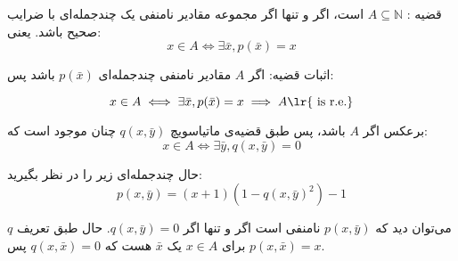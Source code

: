 قضیه :
$A\subseteq \mathbb{N}$  است، اگر و تنها اگر مجموعه مقادیر نامنفی یک چندجمله‌ای با ضرایب صحیح باشد. یعنی:
$$
x\in A \iff \exists \bar{x}, p(\bar{x}) = x
$$


اثبات قضیه: اگر $A$ مقادیر نامنفی چندجمله‌ای $p(\bar{x})$
باشد
پس:

$$
x\in A \iff \exists \bar{x}, p(\bar{x}) = x \implies A \text{\lr{ is r.e.}}
$$

برعکس اگر $A$  باشد، پس طبق قضیه‌ی ماتیاسویچ 
$q(x, \bar{y})$
چنان موجود است که:
$$
x \in A \iff \exists \bar{y}, q(x, \bar{y}) = 0
$$

حال چندجمله‌ای زیر را در نظر بگیرید:
$$
p(x,\bar{y}) = (x+1)(1-q(x, \bar{y})^2)-1
$$

می‌توان دید که $p(x,\bar{y})$
نامنفی‌ است اگر و تنها اگر $q(x,\bar{y}) = 0$.
حال طبق تعریف $q$
برای $x\in A$ یک $\bar{x}$ هست که 
$q(x,\bar{x}) = 0$
پس
$p(x,\bar{x}) = x$.